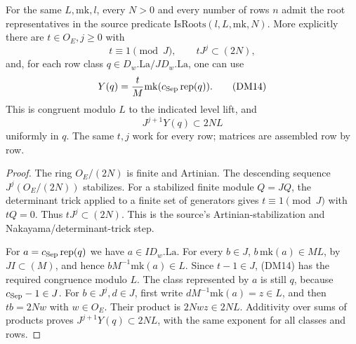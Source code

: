 \begin{lemma}
\label{lem:ftb-actual-half-level-roots}
For the same \(L,\mathrm{mk},l\), every \(N>0\) and every
number of rows \(n\) admit the root representatives in the
source predicate \(\mathrm{IsRoots}(l,L,\mathrm{mk},N)\).
More explicitly there are \(t\in O_E,j\ge0\) with
\[
       t\equiv1\pmod J,\qquad tJ^j\subset(2N),
\]
and, for each row class \(q\in
D_w.\mathrm{La}/J D_w.\mathrm{La}\), one can use
\[
            Y(q)=\frac{t}{M}
                       \mathrm{mk}(c_{\rm Sep}\operatorname{rep}(q)).
                                                               \tag{DM14}
\]
This is congruent modulo \(L\) to the indicated level lift,
and
\[
                         J^{j+1}Y(q)\subset2NL
\]
uniformly in \(q\).
The same \(t,j\) work for every row; matrices are assembled
row by row.
\end{lemma}
\begin{proof}
The ring \(O_E/(2N)\) is finite and Artinian.
The descending sequence
\(J^j(O_E/(2N))\) stabilizes.
For a stabilized finite module \(Q=JQ\), the determinant
trick applied to a finite set of generators gives
\(t\equiv1\pmod J\) with \(tQ=0\).
Thus \(tJ^j\subset(2N)\).
This is the source's Artinian-stabilization and
Nakayama/determinant-trick step.

For \(a=c_{\rm Sep}\operatorname{rep}(q)\) we have
\(a\in I D_w.\mathrm{La}\).
For every \(b\in J\), \(b\,\mathrm{mk}(a)\in ML\), by
\(JI\subset(M)\), and hence
\(bM^{-1}\mathrm{mk}(a)\in L\).
Since \(t-1\in J\), (DM14) has the required congruence
modulo \(L\).
The class represented by \(a\) is still \(q\), because
\(c_{\rm Sep}-1\in J\).
For \(b\in J^j,d\in J\), first write
\(dM^{-1}\mathrm{mk}(a)=z\in L\), and then
\(tb=2Nw\) with \(w\in O_E\).
Their product is \(2Nwz\in2NL\).
Additivity over sums of products proves
\(J^{j+1}Y(q)\subset2NL\), with the same exponent for all
classes and rows.
\end{proof}

